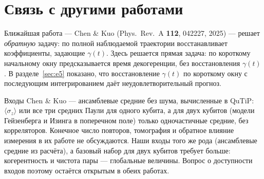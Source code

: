 \documentclass[12pt,a4paper]{report}
\numberwithin{equation}{chapter}
\begin{document}
\section{Связь с другими работами}

Ближайшая работа --- Chen \& Kuo (Phys.\ Rev.\ A \textbf{112}, 042227, 2025)
--- решает \emph{обратную} задачу: по полной наблюдаемой траектории
восстанавливает коэффициенты, задающие $\gamma(t)$. Здесь решается прямая
задача: по короткому начальному окну предсказывается время декогеренции, без
восстановления $\gamma(t)$. В разделе~\ref{sec:e5} показано, что
восстановление $\gamma(t)$ по короткому окну с последующим интегрированием
даёт неудовлетворительный прогноз.

Входы Chen \& Kuo --- ансамблевые средние без шума, вычисленные в QuTiP:
$\langle\sigma_z\rangle$ или все три средних Паули для одного кубита, а для
двух кубитов (модели Гейзенберга и Изинга в поперечном поле) только
одночастичные средние, без корреляторов. Конечное число повторов, томография и
обратное влияние измерения в их работе не обсуждаются. Наши входы того же
рода (ансамблевые средние из расчёта), а базовый набор для двух кубитов
требует больше: когерентность и чистота пары --- глобальные величины. Вопрос о
доступности входов поэтому остаётся открытым в обеих работах.
\end{document}

